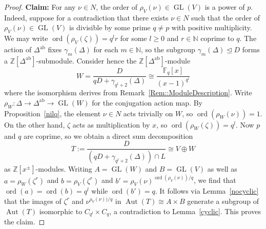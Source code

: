 \documentclass{amsart}
\numberwithin{theorem}{section}
\numberwithin{equation}{section}
\newcommand{\Z}{\mathbb{Z}}
\begin{document}
\begin{proof}
\textbf{Claim:} For any $\nu \in N$, the order of $\rho_V(\nu) \in \operatorname{GL}(V)$ is a power of $p$. Indeed, suppose for a contradiction that there exists $\nu \in N$ such that the order of $\rho_V(\nu) \in \operatorname{GL}(V)$ is divisible by some prime $q \neq p$ with positive multiplicity. We may write $\operatorname{ord}(\rho_V(\zeta)) = q^lr$ for some $l \geq 0$ and $r \in \mathbb{N}$ coprime to $q$. The action of $\Delta^\mathrm{ab}$ fixes $\gamma_m(\Delta)$ for each $m \in \mathbb{N}$, so the subgroup $\gamma_m(\Delta) \trianglelefteq D$ forms a $\Z[\Delta^\mathrm{ab}]$-submodule. Consider hence the $\mathbb{Z}[\Delta^\mathrm{ab}]$-module \[
W=\frac{D}{qD+\gamma_{q^l+2}(\Delta)} \cong \frac{\mathbb{F}_q[x]}{(x - 1)^{q^l}}
\]
where the isomorphism derives from Remark~\ref{Rem::ModuleDescription}. Write $\rho_W \colon \Delta \to \Delta^\mathrm{ab} \to \operatorname{GL}(W)$ for the conjugation action map. By Proposition~\ref{nilq}, the element $\nu \in N$ acts trivially on $W$, so $\operatorname{ord}(\rho_W(\nu)) = 1$. On the other hand, $\zeta$ acts as multiplication by $x$, so $ \operatorname{ord}(\rho_W(\zeta)) = q^l$. Now $p$ and $q$ are coprime, so we obtain a direct sum decomposition
\[
T := \frac{D}{\left(qD+\gamma_{q^l+2}(\Delta)\right) \cap L} \cong V \oplus W
\]
as $\Z[x^\pm]$-modules. Writing $ A = \operatorname{GL}(W)$ and $B = \operatorname{GL}(V)$ as well as $a = \rho_W(\zeta^r)$ and $b = \rho_V(\zeta^r)$ and $b' = \rho_V(\nu)^{\operatorname{ord}(\rho_V(\nu))/q}$, we find that $\operatorname{ord}(a) = \operatorname{ord}(b) = q^l$ while $\operatorname{ord}(b') = q$. It follows via Lemma~\ref{nocyclic} that the images of $\zeta^r$ and $\nu^{\rho_V(\nu))/q}$ in $\operatorname{Aut}(T) \cong A \times B$ generate a subgroup of $\operatorname{Aut}(T)$ isomorphic to $C_{q^l} \times C_q$, a contradiction to Lemma~\ref{cyclic}. This proves the claim.


\end{proof}
\end{document}

